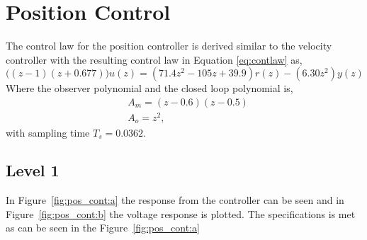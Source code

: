 \documentclass[12pt,a4paper]{article}
\begin{document}
\section*{Position Control}
  The control law for the position controller is derived similar to the
  velocity controller with the resulting control law in Equation
  \ref{eq:contlaw} as,
  \begin{equation}
      \big((z-1)(z+0.677))u(z)=(71.4z^2-105z+39.9)r(z)-(6.30z^2)y(z)
  \end{equation}
  Where the observer polynomial and the closed loop polynomial is,
  \begin{align*}
        &A_m = (z-0.6)(z-0.5)\\
        &A_o = z^2,
  \end{align*}
  with sampling time $T_s=0.0362$.
  \subsection*{Level 1} 
  In Figure~\ref{fig:pos_cont:a} the response from
  the controller can be seen and in Figure~\ref{fig:pos_cont:b} the
  voltage response is plotted. The specifications is met as can be seen
  in the Figure~\ref{fig:pos_cont:a}
\end{document}

